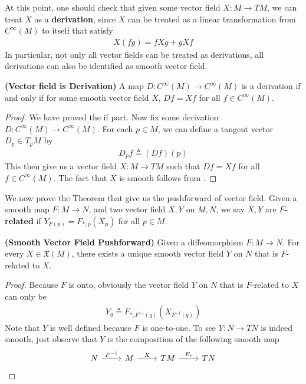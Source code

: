 \documentclass{report}
\begin{document}
\begin{mdframed}
At this point, one should check that given some vector field $X:M\rightarrow TM$, we can treat $X$ as a  \textbf{derivation}, since $X$ can be treated as a linear transformation from   $C^{\infty}(M)$ to itself that satisfy 
\begin{align*}
X(fg)=fXg+gXf
\end{align*}
In particular, not only all vector fields can be treated as derivations, all derivations can also be identified as smooth vector field. 
\end{mdframed}
\begin{theorem}
\label{VfiD}
\textbf{(Vector field is Derivation)} A map $D:C^{\infty}(M)\rightarrow C^{\infty}(M)$ is a derivation if and only if for some smooth vector field $X$, $Df=Xf$  for all $f\in C^{\infty}(M)$. 
\end{theorem}
\begin{proof}
We have proved the if part. Now fix some derivation $D:C^{\infty}(M)\rightarrow C^{\infty}(M)$. For each $p\in  M$, we can define a tangent vector  $D_p\in T_pM$ by 
\begin{align*}
D_pf\triangleq (Df)(p)
\end{align*}
This then give us a vector field $X:M\rightarrow TM$ such that $Df=Xf$ for all  $f\in C^{\infty}(M)$. The fact that $X$ is smooth follows from  . 
\end{proof}
\begin{mdframed}
  We now prove the Theorem that give us the pushforward of vector field. Given a smooth map $F:M\rightarrow N$, and two vector field $X,Y$ on  $M,N$, we say  $X,Y$ are  \textbf{$F$-related} if $Y_{F(p)}=F_{*,p}(X_p)$ for all $p \in M$. 
\end{mdframed}
\begin{theorem}
\label{SVFP}
\textbf{(Smooth Vector Field Pushforward)} Given a diffeomorphism $F:M\rightarrow N$. For every $X \in \mathfrak{X}(M)$, there exists a unique smooth vector field $Y$ on  $N$ that is  $F$-related to  $X$. 
\end{theorem}
\begin{proof}
Because $F$ is onto, obviously the vector field  $Y$ on  $N$ that is  $F$-related to  $X$ can only be
\begin{align*}
Y_q\triangleq F_{*,F^{-1}(q)}(X_{F^{-1}(q)})
\end{align*}
Note that $Y$ is well defined because  $F$ is one-to-one. To see $Y:N\rightarrow TN$ is indeed smooth, just observe that $Y$ is the composition of the following smooth map
\[\begin{tikzcd}
	N & M & TM & TN
	\arrow["{F^{-1}}", from=1-1, to=1-2]
	\arrow["X", from=1-2, to=1-3]
	\arrow["{F_*}", from=1-3, to=1-4]
\end{tikzcd}\]
\end{proof}
\end{document}
